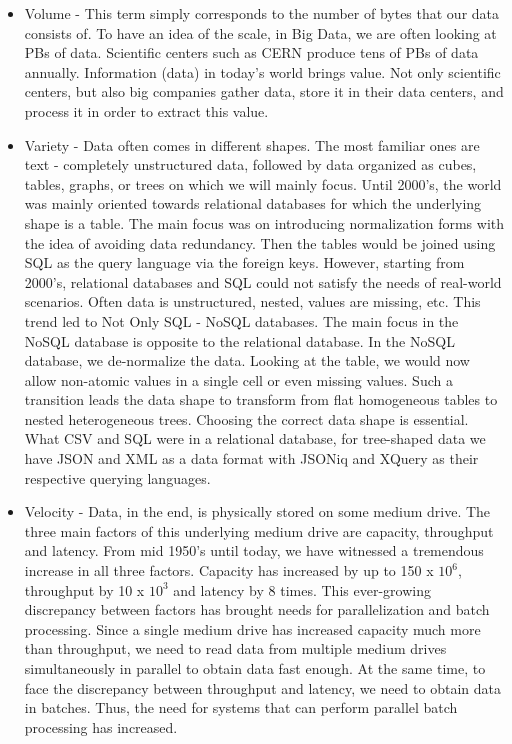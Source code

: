 \begin{itemize}
	\item Volume - This term simply corresponds to the number of bytes that our data consists of. To have an idea of the scale, in Big Data, we are often looking at PBs of data. Scientific centers such as CERN produce tens of PBs of data annually. Information (data) in today's world brings value. Not only scientific centers, but also big companies gather data, store it in their data centers, and process it in order to extract this value.
	\item Variety - Data often comes in different shapes. The most familiar ones are text - completely unstructured data, followed by data organized as cubes, tables, graphs, or trees on which we will mainly focus. Until 2000's, the world was mainly oriented towards relational databases for which the underlying shape is a table. The main focus was on introducing normalization forms with the idea of avoiding data redundancy. Then the tables would be joined using SQL as the query language via the foreign keys. However, starting from 2000's, relational databases and SQL could not satisfy the needs of real-world scenarios. Often data is unstructured, nested, values are missing, etc. This trend led to Not Only SQL - NoSQL databases. The main focus in the NoSQL database is opposite to the relational database. In the NoSQL database, we de-normalize the data. Looking at the table, we would now allow non-atomic values in a single cell or even missing values. Such a transition leads the data shape to transform from flat homogeneous tables to nested heterogeneous trees. Choosing the correct data shape is essential. What CSV and SQL were in a relational database, for tree-shaped data we have JSON and XML as a data format with JSONiq and XQuery as their respective querying languages.
	\item Velocity - Data, in the end, is physically stored on some medium drive. The three main factors of this underlying medium drive are capacity, throughput and latency. From mid 1950's until today, we have witnessed a tremendous increase in all three factors. Capacity has increased by up to 150 x $10^6$, throughput by 10 x $10^3$  and latency by 8 times. This ever-growing discrepancy between factors has brought needs for parallelization and batch processing. Since a single medium drive has increased capacity much more than throughput, we need to read data from multiple medium drives simultaneously in parallel to obtain data fast enough. At the same time, to face the discrepancy between throughput and latency, we need to obtain data in batches. Thus, the need for systems that can perform parallel batch processing has increased.
\end{itemize}
